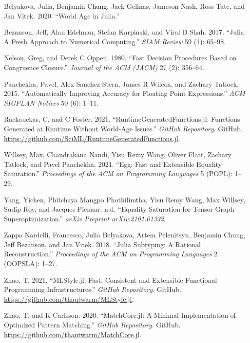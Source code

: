 \documentclass[
]{article}
\newlength{\cslhangindent}
\newenvironment{cslreferences}%
  {\setlength{\parindent}{0pt}%
  \everypar{\setlength{\hangindent}{\cslhangindent}}\ignorespaces}%
  {\par}
\begin{document}
\hypertarget{refs}{}
\begin{cslreferences}
\leavevmode\hypertarget{ref-belyakova2020world}{}%
Belyakova, Julia, Benjamin Chung, Jack Gelinas, Jameson Nash, Ross Tate,
and Jan Vitek. 2020. ``World Age in Julia.''

\leavevmode\hypertarget{ref-bezanson2017julia}{}%
Bezanson, Jeff, Alan Edelman, Stefan Karpinski, and Viral B Shah. 2017.
``Julia: A Fresh Approach to Numerical Computing.'' \emph{SIAM Review}
59 (1): 65--98.

\leavevmode\hypertarget{ref-nelson1980fast}{}%
Nelson, Greg, and Derek C Oppen. 1980. ``Fast Decision Procedures Based
on Congruence Closure.'' \emph{Journal of the ACM (JACM)} 27 (2):
356--64.

\leavevmode\hypertarget{ref-panchekha2015automatically}{}%
Panchekha, Pavel, Alex Sanchez-Stern, James R Wilcox, and Zachary
Tatlock. 2015. ``Automatically Improving Accuracy for Floating Point
Expressions.'' \emph{ACM SIGPLAN Notices} 50 (6): 1--11.

\leavevmode\hypertarget{ref-rgf}{}%
Rackauckas, C, and C Foster. 2021. ``RuntimeGeneratedFunctions.jl:
Functions Generated at Runtime Without World-Age Issues.'' \emph{GitHub
Repository}. GitHub.
\url{https://github.com/SciML/RuntimeGeneratedFunctions.jl}.

\leavevmode\hypertarget{ref-egg}{}%
Willsey, Max, Chandrakana Nandi, Yisu Remy Wang, Oliver Flatt, Zachary
Tatlock, and Pavel Panchekha. 2021. ``Egg: Fast and Extensible Equality
Saturation.'' \emph{Proceedings of the ACM on Programming Languages} 5
(POPL): 1--29.

\leavevmode\hypertarget{ref-yang2021equality}{}%
Yang, Yichen, Phitchaya Mangpo Phothilimtha, Yisu Remy Wang, Max
Willsey, Sudip Roy, and Jacques Pienaar. n.d. ``Equality Saturation for
Tensor Graph Superoptimization.'' \emph{arXiv Preprint
arXiv:2101.01332}.

\leavevmode\hypertarget{ref-zappa2018julia}{}%
Zappa Nardelli, Francesco, Julia Belyakova, Artem Pelenitsyn, Benjamin
Chung, Jeff Bezanson, and Jan Vitek. 2018. ``Julia Subtyping: A Rational
Reconstruction.'' \emph{Proceedings of the ACM on Programming Languages}
2 (OOPSLA): 1--27.

\leavevmode\hypertarget{ref-mlstyle}{}%
Zhao, T. 2021. ``MLStyle.jl: Fast, Consistent and Extensible Functional
Programming Infrastructures.'' \emph{GitHub Repository}. GitHub.
\url{https://github.com/thautwarm/MLStyle.jl}.

\leavevmode\hypertarget{ref-matchcore}{}%
Zhao, T, and K Carlsson. 2020. ``MatchCore.jl: A Minimal Implementation
of Optimized Pattern Matching.'' \emph{GitHub Repository}. GitHub.
\url{https://github.com/thautwarm/MatchCore.jl}.
\end{cslreferences}
\end{document}
